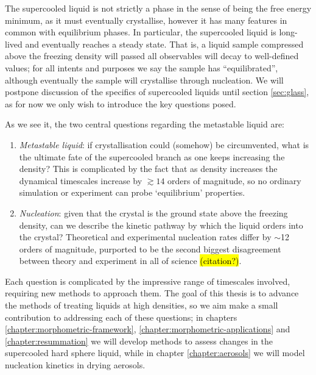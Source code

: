 \documentclass[11pt,twoside]{report}
\begin{document}
The supercooled liquid is not strictly a phase in the sense of being the free energy minimum, as it must eventually crystallise, however it has many features in common with equilibrium phases.
In particular, the supercooled liquid is long-lived and eventually reaches a steady state.
That is, a liquid sample compressed above the freezing density will  passed all observables will decay to well-defined values; for all intents and purposes we say the sample has ``equilibrated'', although eventually the sample will crystallise through nucleation.
We will postpone discussion of the specifics of supercooled liquids until section \ref{sec:glass}, as for now we only wish to introduce the key questions posed.

As we see it, the two central questions regarding the metastable liquid are:
\begin{enumerate}
\item \emph{Metastable liquid}: if crystallisation could (somehow) be circumvented, what is the ultimate fate of the supercooled branch as one keeps increasing the density?
  This is complicated by the fact that as density increases the dynamical timescales increase by $\gtrsim 14$ orders of magnitude, so no ordinary simulation or experiment can probe `equilibrium' properties.
\item \emph{Nucleation}: given that the crystal is the ground state above the freezing density, can we describe the kinetic pathway by which the liquid orders into the crystal?
  Theoretical and experimental nucleation rates differ by $\sim$12 orders of magnitude, purported to be the second biggest disagreement between theory and experiment in all of science \hl{(citation?)}.
\end{enumerate}
Each question is complicated by the impressive range of timescales involved, requiring new methods to approach them.
The goal of this thesis is to advance the methods of treating liquids at high densities, so we aim make a small contribution to addressing each of these questions; in chapters \ref{chapter:morphometric-framework}, \ref{chapter:morphometric-applications} and \ref{chapter:resummation} we will develop methods to assess changes in the supercooled hard sphere liquid, while in chapter \ref{chapter:aerosols} we will model nucleation kinetics in drying aerosols.

\end{document}
